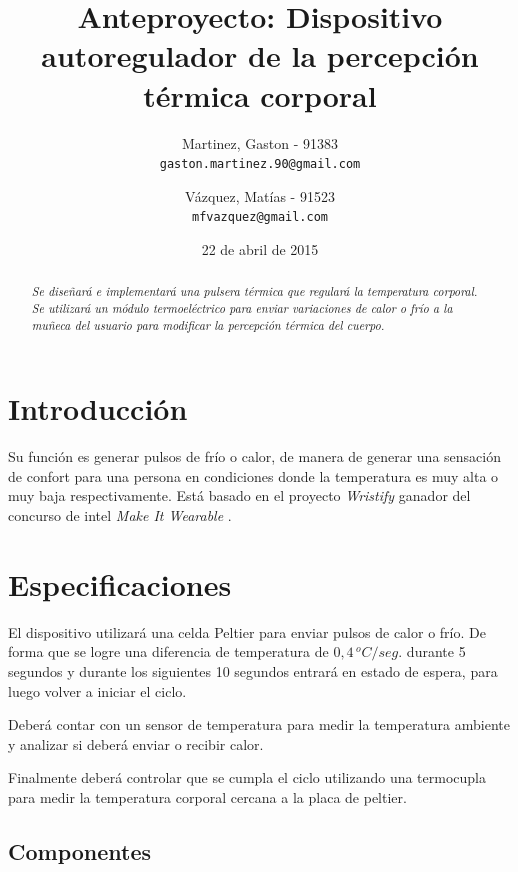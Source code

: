 \documentclass[10pt,spanish,a4paper,openany,notitlepage]{article}
\begin{document}
\title{\textbf{Anteproyecto: Dispositivo autoregulador de la percepción térmica corporal}}
\author{
  Martinez, Gaston - 91383\\
  \texttt{gaston.martinez.90@gmail.com}  
  \and
   Vázquez, Matías - 91523\\
  \texttt{mfvazquez@gmail.com}
}
\date{22 de abril de 2015}
\maketitle

\begin{abstract} %
\emph{Se diseñará e implementará una pulsera térmica que regulará la
temperatura corporal. Se utilizará un módulo termoeléctrico para enviar
variaciones de calor o frío a la muñeca del usuario para modificar
la percepción térmica del cuerpo.}
\end{abstract}

\section{Introducción}

Su función es generar pulsos de frío o calor, de manera de generar una sensación de 
confort para una persona en condiciones donde la temperatura es muy alta 
o muy baja respectivamente.
Está basado en el proyecto \emph{Wristify} \cite{embrlabs} ganador del concurso de intel 
\emph{Make It Wearable} \cite{Make It Wearable}.

\section{Especificaciones}

El dispositivo utilizará una celda Peltier para enviar pulsos de calor
o frío. De forma que se logre una diferencia de temperatura de $0,4\, \unit{^oC/seg.}$
durante 5 segundos y durante los siguientes 10 segundos entrará
en estado de espera, para luego volver a iniciar el ciclo. 

Deberá contar con un sensor de temperatura para medir la temperatura ambiente
y analizar si deberá enviar o recibir calor.

Finalmente deberá controlar que se cumpla el ciclo utilizando una termocupla
para medir la temperatura corporal cercana a la placa de peltier.

\subsection{Componentes}
\end{document}
